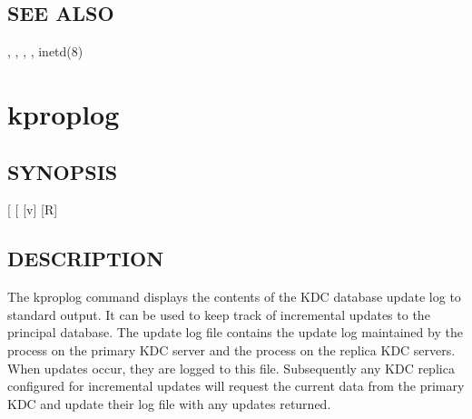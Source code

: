 \documentclass[letterpaper,10pt,english]{sphinxmanual}
\begin{document}
\subsection{SEE ALSO}
\label{\detokenize{admin/admin_commands/kpropd:see-also}}
\sphinxAtStartPar
{\hyperref[\detokenize{admin/admin_commands/kprop:kprop-8}]{}}, {\hyperref[\detokenize{admin/admin_commands/kdb5_util:kdb5-util-8}]{}}, {\hyperref[\detokenize{admin/admin_commands/krb5kdc:krb5kdc-8}]{}},
, inetd(8)

\sphinxstepscope


\section{kproplog}
\label{\detokenize{admin/admin_commands/kproplog:kproplog}}\label{\detokenize{admin/admin_commands/kproplog:kproplog-8}}\label{\detokenize{admin/admin_commands/kproplog::doc}}

\subsection{SYNOPSIS}
\label{\detokenize{admin/admin_commands/kproplog:synopsis}}
\sphinxAtStartPar
{} {[}\sphinxstylestrong{\sphinxhyphen{}h}{]} {[} \sphinxstyleemphasis{num}{]} {[}\sphinxhyphen{}v{]}
 {[}\sphinxhyphen{}R{]}


\subsection{DESCRIPTION}
\label{\detokenize{admin/admin_commands/kproplog:description}}
\sphinxAtStartPar
The kproplog command displays the contents of the KDC database update
log to standard output.  It can be used to keep track of incremental
updates to the principal database.  The update log file contains the
update log maintained by the {\hyperref[\detokenize{admin/admin_commands/kadmind:kadmind-8}]{}} process on the primary
KDC server and the {\hyperref[\detokenize{admin/admin_commands/kpropd:kpropd-8}]{}} process on the replica KDC
servers.  When updates occur, they are logged to this file.
Subsequently any KDC replica configured for incremental updates will
request the current data from the primary KDC and update their log
file with any updates returned.
\end{document}
